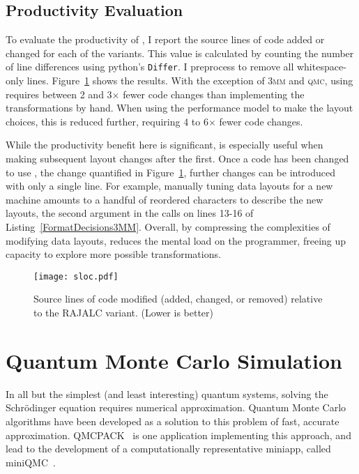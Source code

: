 \subsection{Productivity Evaluation}

To evaluate the productivity of \FormatDecisions{}, I report the source lines of code added or changed for each of the variants.
This value is calculated by counting the number of line differences using python's \verb.Differ.. 
I preprocess to remove all whitespace-only lines.
Figure~\ref{PolybenchSLOC} shows the results.
With the exception of \textsc{3mm} and \textsc{qmc}, using \FormatDecisions{} requires between 2 and 3$\times$ fewer code changes than implementing the transformations by hand. 
When using the performance model to make the layout choices, this is reduced further, requiring 4 to 6$\times$ fewer code changes. 

While the productivity benefit here is significant, \FormatDecisions{} is especially useful when making subsequent layout changes after the first. 
Once a code has been changed to use \FormatDecisions{}, the change quantified in Figure~\ref{PolybenchSLOC}, further changes can be introduced with only a single line. 
For example, manually tuning data layouts for a new machine amounts to a handful of reordered characters to describe the new layouts, the second argument in the calls on lines 13-16 of Listing~\ref{FormatDecisions3MM}. 
Overall, by compressing the complexities of modifying data layouts, \FormatDecisions{} reduces the mental load on the programmer, freeing up capacity to explore more possible transformations.

\begin{figure}
	\texttt{[image: sloc.pdf]}
	\caption{Source lines of code modified (added, changed, or removed) relative to the  RAJALC variant. (Lower is better)}
	\label{PolybenchSLOC}  

\end{figure}

\section{Quantum Monte Carlo Simulation}
\label{sec:miniQMC}
In all but the simplest (and least interesting) quantum systems, solving the Schr\"odinger equation requires numerical approximation. 
Quantum Monte Carlo algorithms have been developed as a solution to this problem of fast, accurate approximation.
QMCPACK~\cite{kim2018qmcpack} is one application implementing this approach, and lead to the development of a computationally representative miniapp, called miniQMC~\cite{richards2018fy18}.

